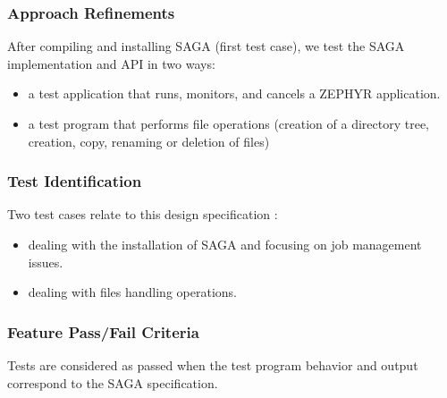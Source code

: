 \subsubsection{Approach Refinements}

After compiling and installing SAGA (first test case), we test the
SAGA implementation and API in two ways: 
\begin{itemize}
 \item a test application that runs, monitors, and cancels a ZEPHYR application.
 \item a test program that performs file operations (creation of a directory
       tree, creation, copy, renaming or deletion of files)
\end{itemize}

\subsubsection{Test Identification}

Two test cases relate to this design specification :
\begin{itemize}
 \item {} dealing with the
       installation of SAGA and focusing on job management issues.
 \item {} dealing with files
       handling operations.
\end{itemize}

\subsubsection{Feature Pass/Fail Criteria}

Tests are considered as passed when the test program behavior and output
correspond to the SAGA specification.
